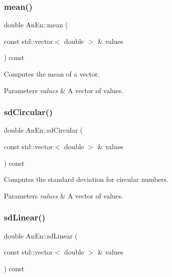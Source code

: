 \subsubsection{\texorpdfstring{mean()}{mean()}}
{\footnotesize\ttfamily double An\+En\+::mean (\begin{DoxyParamCaption}\item[{const std\+::vector$<$ double $>$ \&}]{values }\end{DoxyParamCaption}) const}

Computes the mean of a vector. 
\begin{DoxyParams}{Parameters}
{\em values} & A vector of values. \\
\hline
\end{DoxyParams}
\mbox{\label{class_an_en_aa06ebc1ce7ac87369156dc88976042a1}} 
\subsubsection{\texorpdfstring{sd\+Circular()}{sdCircular()}}
{\footnotesize\ttfamily double An\+En\+::sd\+Circular (\begin{DoxyParamCaption}\item[{const std\+::vector$<$ double $>$ \&}]{values }\end{DoxyParamCaption}) const}

Computes the standard deviation for circular numbers.


\begin{DoxyParams}{Parameters}
{\em values} & A vector of values. \\
\hline
\end{DoxyParams}
\mbox{\label{class_an_en_a7d7b0d5d3a607ebd4b624ddc07e55c57}} 
\subsubsection{\texorpdfstring{sd\+Linear()}{sdLinear()}}
{\footnotesize\ttfamily double An\+En\+::sd\+Linear (\begin{DoxyParamCaption}\item[{const std\+::vector$<$ double $>$ \&}]{values }\end{DoxyParamCaption}) const}

